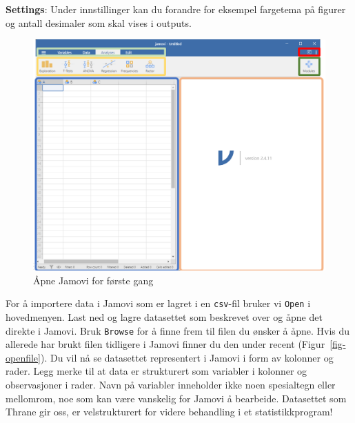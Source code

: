 \documentclass[
  letterpaper,
  DIV=11,
  numbers=noendperiod,
  oneside]{scrreprt}
\begin{document}
{\textbf{Settings}}: Under innstillinger kan du forandre for eksempel
fargetema på figurer og antall desimaler som skal vises i outputs.

\begin{figure}

{\centering \includegraphics{img/01-jamovi/first-open.png}

}

\caption{\label{fig-firstopen}Åpne Jamovi for første gang}

\end{figure}

For å importere data i Jamovi som er lagret i en \texttt{csv}-fil bruker
vi \texttt{Open} i hovedmenyen. Last ned og lagre datasettet som
beskrevet over og åpne det direkte i Jamovi. Bruk \texttt{Browse} for å
finne frem til filen du ønsker å åpne. Hvis du allerede har brukt filen
tidligere i Jamovi finner du den under recent
(Figur~\ref{fig-openfile}). Du vil nå se datasettet representert i
Jamovi i form av kolonner og rader. Legg merke til at data er
strukturert som variabler i kolonner og observasjoner i rader. Navn på
variabler inneholder ikke noen spesialtegn eller mellomrom, noe som kan
være vanskelig for Jamovi å bearbeide. Datasettet som Thrane gir oss, er
velstrukturert for videre behandling i et statistikkprogram!
\end{document}
